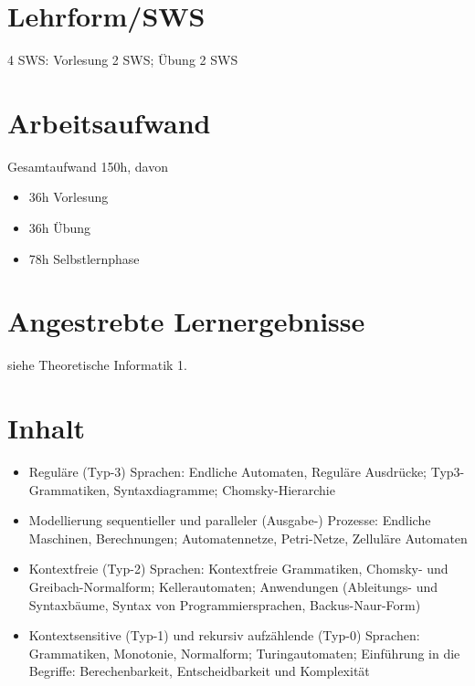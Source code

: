 \section*{Lehrform/SWS\label{/mi-2017/modulbeschreibungen-bachelor/BA_TheoretischeInformatik2}}\label{lehrformswspathlabelmi-2017modulbeschreibungen-bachelorbaux5ftheoretischeinformatik2}

4 SWS: Vorlesung 2 SWS; Übung 2 SWS

\section*{Arbeitsaufwand\label{/mi-2017/modulbeschreibungen-bachelor/BA_TheoretischeInformatik2}}\label{arbeitsaufwandpathlabelmi-2017modulbeschreibungen-bachelorbaux5ftheoretischeinformatik2}

Gesamtaufwand 150h, davon

\begin{itemize}
\tightlist
\item
  36h Vorlesung
\item
  36h Übung
\item
  78h Selbstlernphase
\end{itemize}

\section*{Angestrebte
Lernergebnisse\label{/mi-2017/modulbeschreibungen-bachelor/BA_TheoretischeInformatik2}}\label{angestrebte-lernergebnissepathlabelmi-2017modulbeschreibungen-bachelorbaux5ftheoretischeinformatik2}

siehe Theoretische Informatik 1.

\section*{Inhalt\label{/mi-2017/modulbeschreibungen-bachelor/BA_TheoretischeInformatik2}}\label{inhaltpathlabelmi-2017modulbeschreibungen-bachelorbaux5ftheoretischeinformatik2}

\begin{itemize}
\tightlist
\item
  Reguläre (Typ-3) Sprachen: Endliche Automaten, Reguläre Ausdrücke;
  Typ3-Grammatiken, Syntaxdiagramme; Chomsky-Hierarchie
\item
  Modellierung sequentieller und paralleler (Ausgabe-) Prozesse:
  Endliche Maschinen, Berechnungen; Automatennetze, Petri-Netze,
  Zelluläre Automaten
\item
  Kontextfreie (Typ-2) Sprachen: Kontextfreie Grammatiken, Chomsky- und
  Greibach-Normalform; Kellerautomaten; Anwendungen (Ableitungs- und
  Syntaxbäume, Syntax von Programmiersprachen, Backus-Naur-Form)
\item
  Kontextsensitive (Typ-1) und rekursiv aufzählende (Typ-0) Sprachen:
  Grammatiken, Monotonie, Normalform; Turingautomaten; Einführung in die
  Begriffe: Berechenbarkeit, Entscheidbarkeit und Komplexität
\end{itemize}

